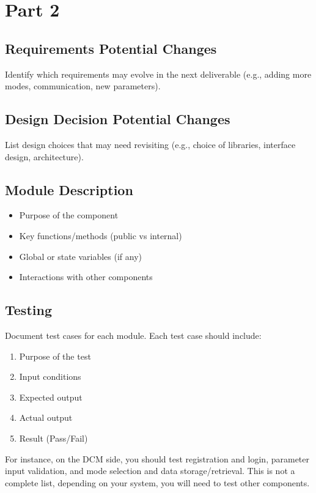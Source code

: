 \documentclass{article}
\begin{document}
\section{Part 2}

\subsection{Requirements Potential Changes}
Identify which requirements may evolve in the next deliverable (e.g., adding more modes, communication, new parameters).

\subsection{Design Decision Potential Changes}
List design choices that may need revisiting (e.g., choice of libraries, interface design, architecture).

\subsection{Module Description}
\begin{itemize}
    \item Purpose of the component
    \item Key functions/methods (public vs internal)
    \item Global or state variables (if any)
    \item Interactions with other components
\end{itemize}

\subsection{Testing}
Document test cases for each module. Each test case should include:

\begin{enumerate}
    \item Purpose of the test
    \item Input conditions
    \item Expected output
    \item Actual output
    \item Result (Pass/Fail)
\end{enumerate}

For instance, on the DCM side, you should test registration and login, parameter input validation, and mode selection and data storage/retrieval. This is not a complete list, depending on your system, you will need to test other components.
\end{document}
